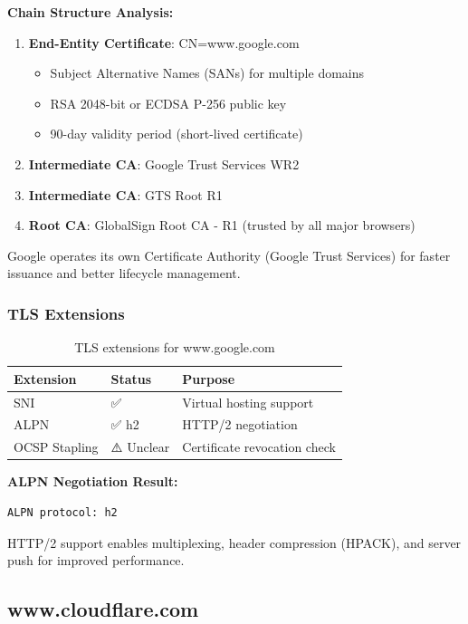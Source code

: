 \documentclass[12pt,a4paper]{article}
\begin{document}
\textbf{Chain Structure Analysis:}
\begin{enumerate}
    \item \textbf{End-Entity Certificate}: CN=www.google.com
    \begin{itemize}
        \item Subject Alternative Names (SANs) for multiple domains
        \item RSA 2048-bit or ECDSA P-256 public key
        \item 90-day validity period (short-lived certificate)
    \end{itemize}
    \item \textbf{Intermediate CA}: Google Trust Services WR2
    \item \textbf{Intermediate CA}: GTS Root R1
    \item \textbf{Root CA}: GlobalSign Root CA - R1 (trusted by all major browsers)
\end{enumerate}

Google operates its own Certificate Authority (Google Trust Services) for faster issuance and better lifecycle management.

\subsubsection{TLS Extensions}

\begin{table}[H]
\centering
\begin{tabular}{@{}llp{6cm}@{}}
\toprule
\textbf{Extension} & \textbf{Status} & \textbf{Purpose} \\ \midrule
SNI & ✅ & Virtual hosting support \\
ALPN & ✅ h2 & HTTP/2 negotiation \\
OCSP Stapling & ⚠️ Unclear & Certificate revocation check \\
\bottomrule
\end{tabular}
\caption{TLS extensions for www.google.com}
\end{table}

\textbf{ALPN Negotiation Result:}
\begin{lstlisting}[style=outputstyle]
ALPN protocol: h2
\end{lstlisting}

HTTP/2 support enables multiplexing, header compression (HPACK), and server push for improved performance.

\subsection{www.cloudflare.com}
\end{document}

